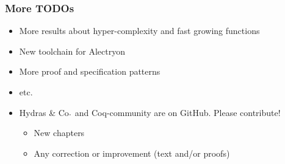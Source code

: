 \documentclass[10pt]{beamer}
\newcommand{\community}{Coq-community\xspace}
\newcommand{\alectr}{Alectryon\xspace}
\newcommand{\Hydras}{Hydras \& Co$\text.$\xspace}
\begin{document}

\begin{frame}
  \frametitle{More TODOs}
  \begin{block}{}
    \begin{itemize}
    \item More results about hyper-complexity and fast growing functions
    \item New toolchain for \alectr
    \item More proof and specification patterns
    \item etc.
    \item \Hydras and \community are on GitHub. Please contribute!
      \begin{itemize}
      \item New chapters
      \item Any correction or improvement (text and/or proofs)
        
      \end{itemize}
    \end{itemize}
    
  \end{block}
  
\end{frame}
\end{document}
